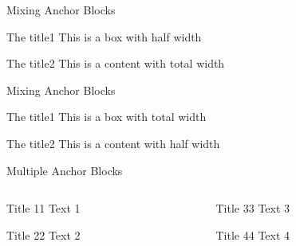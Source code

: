 \documentclass[english,sectioncirclenumberstyle]{ciadbeamer}
\begin{document}
\begin{frame}{Mixing Anchor Blocks}
	\begin{leftanchorblock}[.5\linewidth]{The title}{1}
		This is a box with half width
	\end{leftanchorblock}
	\vspace{.5cm}
	\begin{rightanchorblock}{The title}{2}
		This is a content with total width
	\end{rightanchorblock}
\end{frame}

\begin{frame}{Mixing Anchor Blocks \insertcontinuationtext}
	\begin{leftanchorblock}{The title}{1}
		This is a box with total width
	\end{leftanchorblock}
	\vspace{.5cm}
	\begin{rightanchorblock}[.5\linewidth]{The title}{2}
		This is a content with half width
	\end{rightanchorblock}
\end{frame}

\begin{frame}{Multiple Anchor Blocks}
	\begin{columns}
		\begin{column}{.5\linewidth}
			\begin{leftanchorblock}{Title 1}{1}
				Text 1
			\end{leftanchorblock}
			\vspace{.5cm}
			\begin{leftanchorblock}{Title 2}{2}
				Text 2
			\end{leftanchorblock}
		\end{column}
		\begin{column}{.5\linewidth}
			\begin{rightanchorblock}{Title 3}{3}
				Text 3
			\end{rightanchorblock}
			\vspace{.5cm}
			\begin{rightanchorblock}{Title 4}{4}
				Text 4
			\end{rightanchorblock}
		\end{column}
	\end{columns}
\end{frame}
\end{document}
